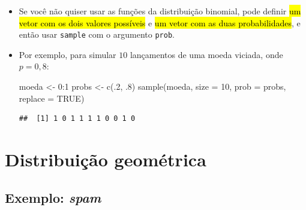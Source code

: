 \documentclass[
  11pt]{report}
\newenvironment{Shaded}{\begin{snugshade}}{\end{snugshade}}
\newcommand{\AttributeTok}[1]{\textcolor[rgb]{0.77,0.63,0.00}{#1}}
\newcommand{\ConstantTok}[1]{\textcolor[rgb]{0.00,0.00,0.00}{#1}}
\newcommand{\DecValTok}[1]{\textcolor[rgb]{0.00,0.00,0.81}{#1}}
\newcommand{\FunctionTok}[1]{\textcolor[rgb]{0.00,0.00,0.00}{#1}}
\newcommand{\NormalTok}[1]{#1}
\newcommand{\OtherTok}[1]{\textcolor[rgb]{0.56,0.35,0.01}{#1}}
\newcommand{\SpecialCharTok}[1]{\textcolor[rgb]{0.00,0.00,0.00}{#1}}
\renewenvironment{Shaded}{
    \begin{mdframed}[%
      roundcorner=2pt,%
      innerleftmargin=5pt,%
      innerrightmargin=5pt,%
      topline=true,%
      leftline=true,%
      rightline=true,%
      bottomline=true,%
      linewidth=0.5pt,%
      linecolor=black!20,%
      backgroundcolor=black!2,%
      skipabove=2ex,%
      skipbelow=2.5ex%
    ]%
  }
  {
    \end{mdframed}
  }
\begin{document}
\begin{itemize}
\item
  Se você não quiser usar as funções da distribuição binomial, pode definir {\hl{um vetor com os dois valores possíveis}} e {\hl{um vetor com as duas probabilidades}}, e então usar \texttt{sample} com o argumento \texttt{prob}.
\item
  Por exemplo, para simular $10$ lançamentos de uma moeda viciada, onde $p = 0{,}8$:

\begin{Shaded}
\begin{Highlighting}[]
\NormalTok{moeda }\OtherTok{\textless{}{-}} \DecValTok{0}\SpecialCharTok{:}\DecValTok{1}
\NormalTok{probs }\OtherTok{\textless{}{-}} \FunctionTok{c}\NormalTok{(.}\DecValTok{2}\NormalTok{, .}\DecValTok{8}\NormalTok{)}
\FunctionTok{sample}\NormalTok{(moeda, }\AttributeTok{size =} \DecValTok{10}\NormalTok{, }\AttributeTok{prob =}\NormalTok{ probs, }\AttributeTok{replace =} \ConstantTok{TRUE}\NormalTok{)}
\end{Highlighting}
\end{Shaded}

\begin{verbatim}
##  [1] 1 0 1 1 1 1 0 0 1 0
\end{verbatim}
\end{itemize}

\hypertarget{distribuiuxe7uxe3o-geomuxe9trica}{%
\section{Distribuição geométrica}\label{distribuiuxe7uxe3o-geomuxe9trica}}

\hypertarget{exemplo-spam}{%
\subsection{\texorpdfstring{Exemplo: \emph{spam}}{Exemplo: spam}}\label{exemplo-spam}}
\end{document}
